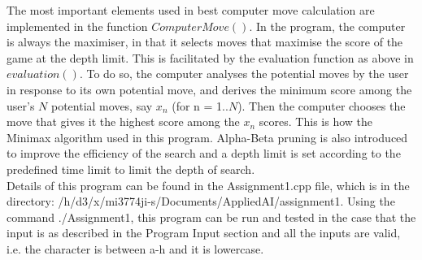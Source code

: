 \documentclass[a4paper, 11pt]{article}
\begin{document}
The most important elements used in best computer move calculation are implemented in the function $ComputerMove()$.
In the program, the computer is always the maximiser, in that it selects moves that maximise the score of the game at the depth limit. This is facilitated by the evaluation function as above in $evaluation()$. To do so, the computer analyses the potential moves by the user in response to its own potential move, and derives the minimum score among the user's $N$ potential moves, say $x_n$ (for n = 1..$N$). Then the computer chooses the move that gives it the highest score among the $x_n$ scores. This is how the Minimax algorithm used in this program. Alpha-Beta pruning is also introduced to improve the efficiency of the search and a depth limit is set according to the predefined time limit to limit the depth of search. \\

Details of this program can be found in the Assignment1.cpp file, which is in the directory: /h/d3/x/mi3774ji-s/Documents/AppliedAI/assignment1. Using the command ./Assignment1, this program can be run and tested in the case that the input is as described in the Program Input section and all the inputs are valid, i.e. the character is between a-h and it is lowercase.
\end{document}
